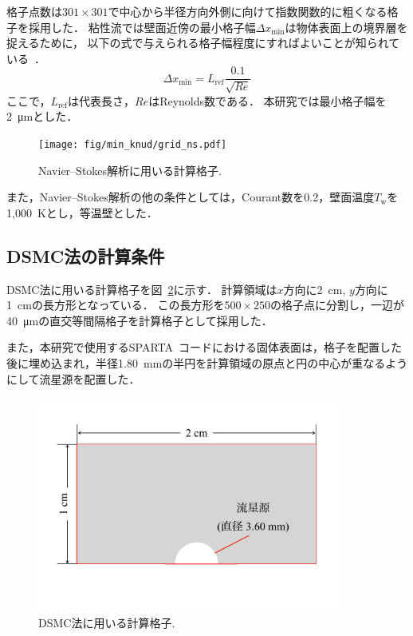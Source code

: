 格子点数は$301\times301$で中心から半径方向外側に向けて指数関数的に粗くなる格子を採用した．
粘性流では壁面近傍の最小格子幅$\Delta x_{\min}$は物体表面上の境界層を捉えるために，
以下の式で与えられる格子幅程度にすればよいことが知られている~\cite{kurohon}．
\begin{equation}
    \Delta x_{\min} = L_\mathrm{ref}\dfrac{0.1}{\sqrt{Re}}
\end{equation}
ここで，$L_\mathrm{ref}$は代表長さ，$Re$はReynolds数である．
本研究では最小格子幅を\SI{2}{\micro\metre}とした．

\begin{figure}[H]
    \centering
    \texttt{[image: fig/min\_knud/grid\_ns.pdf]}
    \caption{Navier–Stokes解析に用いる計算格子.}
    \label{fig:grid-ns}
\end{figure}

また，Navier–Stokes解析の他の条件としては，Courant数を0.2，壁面温度$T_\mathrm{w}$を1,000~Kとし，等温壁とした．


\subsection{DSMC法の計算条件}
DSMC法に用いる計算格子を図~\ref{fig:grid-dsmc}に示す．
計算領域は$x$方向に2~cm, $y$方向に1~cmの長方形となっている．
この長方形を$500\times250$の格子点に分割し，一辺が\SI{40}{\micro\metre}の直交等間隔格子を計算格子として採用した．

また，本研究で使用するSPARTA~\cite{spartaWWW}コードにおける固体表面は，格子を配置した後に埋め込まれ，半径1.80~mmの半円を計算領域の原点と円の中心が重なるようにして流星源を配置した．

\begin{figure}[H]
    \vspace{15mm}
    \centering
    \includegraphics[width=10cm]{fig/min_knud/grid_dsmc.pdf}
    \vspace{-15mm}
    \caption{DSMC法に用いる計算格子.}
    \label{fig:grid-dsmc}
\end{figure}

